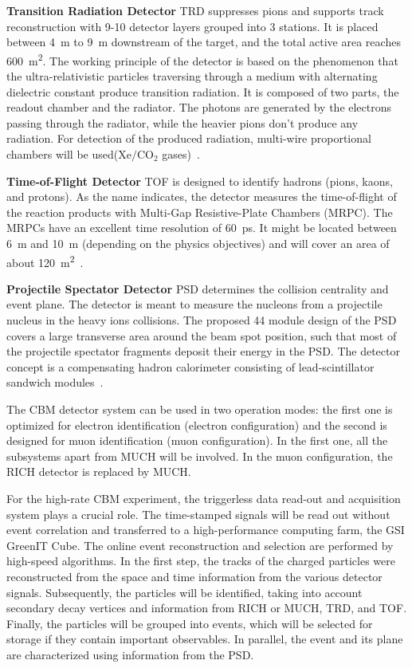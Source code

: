 \textbf{Transition Radiation Detector} \gls{TRD} suppresses pions and  supports track reconstruction with 9-10 detector layers grouped into 3 stations. It is placed between \SI{4}{\metre} to \SI{9}{\metre} downstream of the target, and the total active area reaches \SI{600}{\square\metre}. The working principle of the detector is based on the phenomenon that the ultra-relativistic particles traversing through a medium with alternating dielectric constant produce transition radiation. It is composed of two parts, the readout chamber and the radiator. The photons are generated by the electrons passing through the radiator, while the heavier pions don't produce any radiation. For detection of the produced radiation, multi-wire proportional chambers will be used($\mathrm{Xe/CO_{2}}$ gases)~\cite{TRD}. \bigbreak

\textbf{Time-of-Flight Detector} \gls{TOF} is designed to identify hadrons (pions, kaons, and protons). As the name indicates, the detector measures the time-of-flight of the reaction products with Multi-Gap Resistive-Plate Chambers (\gls{MRPC}). The \glspl{MRPC} have an excellent time resolution of \SI{60}{\pico\second}.  It might be located between \SI{6}{\metre} and \SI{10}{\metre} (depending on the physics objectives) and will cover an area of about \SI{120}{\square\metre}~\cite{TOF}. \bigbreak

\textbf{Projectile Spectator Detector} \gls{PSD} determines the collision centrality and event plane. The detector is meant to measure the nucleons from a projectile nucleus in the heavy ions collisions. The proposed 44 module design of the PSD covers a large transverse area around the beam spot position, such that most of the projectile spectator fragments deposit their energy in the \gls{PSD}. The detector concept is a compensating hadron calorimeter consisting of lead-scintillator sandwich modules~\cite{PSD}.\bigbreak


The CBM detector system can be used in two operation modes: the first one is optimized for electron identification (electron configuration) and the second is designed for muon identification (muon configuration). In the first one, all the subsystems apart from MUCH will be involved. In the muon configuration, the \gls{RICH} detector is replaced by \gls{MUCH}.

For the high-rate CBM experiment, the triggerless data read-out and acquisition system plays a crucial role. The time-stamped signals will be read out without event correlation and transferred to a high-performance computing farm, the GSI GreenIT Cube. The online event reconstruction and selection are performed by high-speed algorithms. In the first step, the tracks of the charged particles were reconstructed from the space and time information from the various detector signals. Subsequently, the particles will be identified, taking into account secondary decay vertices and information from \gls{RICH} or \gls{MUCH}, \gls{TRD}, and \gls{TOF}. Finally, the particles will be grouped into events, which will be selected for storage if they contain important observables. In parallel, the event and its plane are characterized using information from the PSD.

